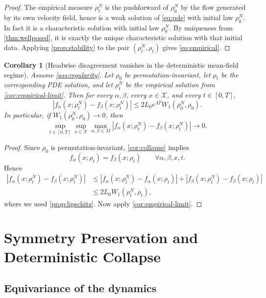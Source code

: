 \documentclass[11pt]{article}
\newtheorem{corollary}[theorem]{Corollary}
\theoremstyle{definition}
\newcommand{\W}{W_1}
\begin{document}
\begin{proof}
The empirical measure $\rho_t^N$ is the pushforward of $\rho_0^N$ by the flow generated by its own velocity field, hence is a weak solution of \eqref{eq:pde} with initial law $\rho_0^N$.
In fact it is a characteristic solution with initial law $\rho_0^N$.
By uniqueness from \cref{thm:wellposed}, it is exactly the unique characteristic solution with that initial data.
Applying \cref{prop:stability} to the pair $(\rho_t^N,\rho_t)$ gives \eqref{eq:empirical}.
\end{proof}

\begin{corollary}[Headwise disagreement vanishes in the deterministic mean-field regime]
\label{cor:disagreement}
Assume \cref{ass:regularity}.
Let $\rho_0$ be permutation-invariant, let $\rho_t$ be the corresponding PDE solution, and let $\rho_t^N$ be the empirical solution from \cref{cor:empirical-limit}.
Then for every $\alpha,\beta$, every $x \in \mathcal{X}$, and every $t\in[0,T]$,
\[
  |f_\alpha(x;\rho_t^N)-f_\beta(x;\rho_t^N)|
  \le
  2L_0 e^{\Lambda T}\W(\rho_0^N,\rho_0).
\]
In particular, if $\W(\rho_0^N,\rho_0)\to 0$, then
\[
  \sup_{t\in[0,T]}
  \sup_{x\in\mathcal{X}}
  \max_{\alpha,\beta\le M}
  |f_\alpha(x;\rho_t^N)-f_\beta(x;\rho_t^N)|
  \to 0.
\]
\end{corollary}

\begin{proof}
Since $\rho_0$ is permutation-invariant, \cref{cor:collapse} implies
\[
  f_\alpha(x;\rho_t)=f_\beta(x;\rho_t)
  \qquad \forall \alpha,\beta,x,t.
\]
Hence
\begin{align*}
  |f_\alpha(x;\rho_t^N)-f_\beta(x;\rho_t^N)|
  &\le
  |f_\alpha(x;\rho_t^N)-f_\alpha(x;\rho_t)|
  +
  |f_\beta(x;\rho_t^N)-f_\beta(x;\rho_t)|
  \\
  &\le
  2L_0 \W(\rho_t^N,\rho_t),
\end{align*}
where we used \cref{prop:lipschitz}.
Now apply \cref{cor:empirical-limit}.
\end{proof}

\section{Symmetry Preservation and Deterministic Collapse}

\subsection{Equivariance of the dynamics}
\end{document}
